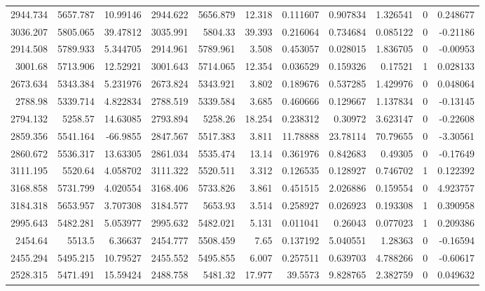 {\begin{center}
\begin{longtable}{rrrrrrrrrrr}
    2944.734 & 5657.787 & 10.99146 & 2944.622 & 5656.879 & 12.318 & 0.111607 & 0.907834 & 1.326541 & 0  & 0.248677 \\
    3036.207 & 5805.065 & 39.47812 & 3035.991 & 5804.33 & 39.393 & 0.216064 & 0.734684 & 0.085122 & 0  & -0.21186 \\
    2914.508 & 5789.933 & 5.344705 & 2914.961 & 5789.961 & 3.508 & 0.453057 & 0.028015 & 1.836705 & 0  & -0.00953 \\
    3001.68 & 5713.906 & 12.52921 & 3001.643 & 5714.065 & 12.354 & 0.036529 & 0.159326 & 0.17521 & \cellcolor[rgb]{ 0,  1,  0}1 & 0.028133 \\
    2673.634 & 5343.384 & 5.231976 & 2673.824 & 5343.921 & 3.802 & 0.189676 & 0.537285 & 1.429976 & 0  & 0.048064 \\
    2788.98 & 5339.714 & 4.822834 & 2788.519 & 5339.584 & 3.685 & 0.460666 & 0.129667 & 1.137834 & 0  & -0.13145 \\
    2794.132 & 5258.57 & 14.63085 & 2793.894 & 5258.26 & 18.254 & 0.238312 & 0.30972 & 3.623147 & 0  & -0.22608 \\
    2859.356 & 5541.164 & -66.9855 & 2847.567 & 5517.383 & 3.811 & 11.78888 & 23.78114 & 70.79655 & 0  & \cellcolor[rgb]{ 1,  .922,  .612}\textcolor[rgb]{ .612,  .396,  0}{-3.30561} \\
    2860.672 & 5536.317 & 13.63305 & 2861.034 & 5535.474 & 13.14 & 0.361976 & 0.842683 & 0.49305 & 0  & -0.17649 \\
    3111.195 & 5520.64 & 4.058702 & 3111.322 & 5520.511 & 3.312 & 0.126535 & 0.128927 & 0.746702 & \cellcolor[rgb]{ 0,  1,  0}1 & 0.122392 \\
    3168.858 & 5731.799 & 4.020554 & 3168.406 & 5733.826 & 3.861 & 0.451515 & 2.026886 & 0.159554 & 0  & \cellcolor[rgb]{ 1,  .922,  .612}\textcolor[rgb]{ .612,  .396,  0}{4.923757} \\
    3184.318 & 5653.957 & 3.707308 & 3184.577 & 5653.93 & 3.514 & 0.258927 & 0.026923 & 0.193308 & \cellcolor[rgb]{ 0,  1,  0}1 & 0.390958 \\
    2995.643 & 5482.281 & 5.053977 & 2995.632 & 5482.021 & 5.131 & 0.011041 & 0.26043 & 0.077023 & \cellcolor[rgb]{ 0,  1,  0}1 & 0.209386 \\
    2454.64 & 5513.5 & 6.36637 & 2454.777 & 5508.459 & 7.65 & 0.137192 & 5.040551 & 1.28363 & 0  & -0.16594 \\
    2455.294 & 5495.215 & 10.79527 & 2455.552 & 5495.855 & 6.007 & 0.257511 & 0.639703 & 4.788266 & 0  & -0.60617 \\
    2528.315 & 5471.491 & 15.59424 & 2488.758 & 5481.32 & 17.977 & 39.5573 & 9.828765 & 2.382759 & 0  & 0.049632 \\

\end{longtable}
\end{center}}
